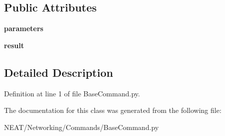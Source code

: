\subsection*{Public Attributes}
\begin{DoxyCompactItemize}
\item 
{\bfseries parameters}\hypertarget{class_n_e_a_t___py_genetics_1_1_n_e_a_t_1_1_networking_1_1_commands_1_1_base_command_1_1_base_command_a50465fec7d23d12cfca6cd0d8b6b8a67}{}\label{class_n_e_a_t___py_genetics_1_1_n_e_a_t_1_1_networking_1_1_commands_1_1_base_command_1_1_base_command_a50465fec7d23d12cfca6cd0d8b6b8a67}

\item 
{\bfseries result}\hypertarget{class_n_e_a_t___py_genetics_1_1_n_e_a_t_1_1_networking_1_1_commands_1_1_base_command_1_1_base_command_aa3136732344967769c806b465e699858}{}\label{class_n_e_a_t___py_genetics_1_1_n_e_a_t_1_1_networking_1_1_commands_1_1_base_command_1_1_base_command_aa3136732344967769c806b465e699858}

\end{DoxyCompactItemize}


\subsection{Detailed Description}


Definition at line 1 of file Base\+Command.\+py.



The documentation for this class was generated from the following file\+:\begin{DoxyCompactItemize}
\item 
N\+E\+A\+T/\+Networking/\+Commands/Base\+Command.\+py\end{DoxyCompactItemize}
